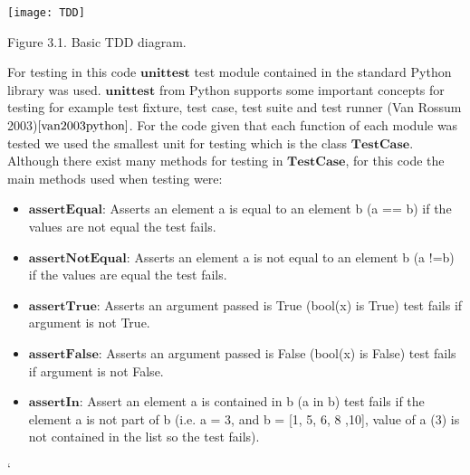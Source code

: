 \documentclass{article}
\begin{document}
\begin{center}
	\texttt{[image: TDD]}

Figure 3.1. Basic TDD diagram.
\end{center}

For testing in this code $\textbf{unittest}$ test module contained in the standard Python library was used. $\textbf{unittest}$ from Python supports some important concepts for testing for example test fixture, test case, test suite and test runner (Van Rossum 2003)$\cite{van2003python}$. For the code given that each function of each module was tested we used the smallest unit for testing which is the class $\textbf{TestCase}$. Although there exist many methods for testing in $\textbf{TestCase}$,  for this code the main methods used when testing were:

\begin{itemize}
	\item $\textbf{assertEqual:}$ Asserts an element a is equal to an element  b (a == b) if the values are not equal the test fails.
	\item $\textbf{assertNotEqual:}$ Asserts an element a is not equal to an element b (a !=b) if the values are equal the test fails.
	\item $\textbf{assertTrue:}$ Asserts an argument passed is True (bool(x) is True) test fails if argument is not True. 
	\item $\textbf{assertFalse:}$ Asserts an argument passed is False (bool(x) is False) test fails if argument is not False.
	\item $\textbf{assertIn:}$ Assert an element a is contained in b (a in b) test fails if the element a is not part of b (i.e. a = 3, and b = [1, 5, 6, 8 ,10], value of a (3) is not contained in the list so the test fails).
\end{itemize}

`
\end{document}
